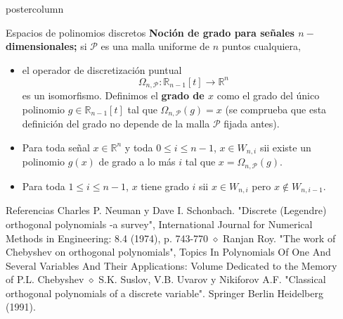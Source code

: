\documentclass[final,hyperref={pdfpagelabels=false}]{beamer}
\newcommand{\IR}{\mathbb{R}}
\newcommand{\cali}[1]{\mathcal{#1}} %
\newlength{\columnheight}
\begin{document}
\begin{frame}
\begin{columns}
\begin{column}{.49\textwidth}
\begin{beamercolorbox}[center,wd=\textwidth]{postercolumn}
\begin{block}{Espacios de polinomios discretos}
			\textbf{Noci\'on de grado para se\~nales $n-$dimensionales;}
			si $\cali{P}$ es una malla uniforme de $n$ puntos cualquiera,  
			\begin{itemize}
			\item el operador de discretizaci\'on puntual
			\[
			\Omega_{n, \cali{P}}: \IR_{n-1}[t] \longrightarrow \IR^{n}
			\]
			es un isomorfismo. Definimos el \textbf{grado de $x$}
			como el grado del \'unico polinomio $g \in \IR_{n-1}[t]$
			tal que $\Omega_{n, \cali{P}} (g) = x$ (se comprueba que esta
			definici\'on del grado no depende de la malla $\cali{P}$ fijada antes).
			\item Para toda se\~nal $x \in \IR^{n}$ y toda $0 \leq i \leq n-1$,
			$x \in W_{n, i}$ sii existe un polinomio $g(x)$ de grado a lo 
			m\'as $i$ tal que $x = \Omega_{n, \cali{P}}(g)$.
			\item Para toda $1 \leq i \leq n-1$, $x$ tiene grado $i$
			sii $x \in W_{n,i}$ pero $x \not\in W_{n, i-1}$.
			\end{itemize}
				
			\end{block}		
			\vfill	
			\vspace{1cm}
			
			
			\begin{block}{Referencias}
			\tiny{
			Charles P. Neuman y Dave I. Schonbach. "Discrete (Legendre) orthogonal
polynomials -a survey", International Journal for Numerical Methods in
Engineering: 8.4 (1974), p. 743-770 $\diamond$
Ranjan Roy. "The work of Chebyshev on orthogonal polynomials", Topics In 
Polynomials Of One And Several Variables And Their Applications: Volume
Dedicated to the Memory of P.L. Chebyshev $\diamond$
S.K. Suslov, V.B. Uvarov y Nikiforov A.F.  "Classical orthogonal polynomials
of a discrete variable". Springer Berlin Heidelberg (1991).}
			\end{block}
       
       
      \end{beamercolorbox}
    \end{column}

    \begin{column}{.49\textwidth}


\end{column}
\end{columns}
\end{frame}
\end{document}
